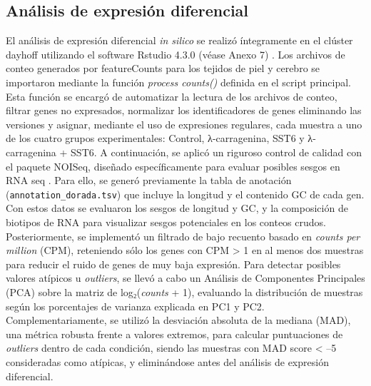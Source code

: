 \documentclass[10pt,a4paper]{article}
\begin{document}
\subsection{Análisis de expresión diferencial}  
El análisis de expresión diferencial \textit{in silico} se realizó íntegramente en el clúster dayhoff utilizando el software Rstudio 4.3.0 (véase Anexo 7) \parencite{RCore2024}. Los archivos de conteo generados por featureCounts para los tejidos de piel y cerebro se importaron mediante la función \textit{process counts()} definida en el script principal. Esta función se encargó de automatizar la lectura de los archivos de conteo, filtrar genes no expresados, normalizar los identificadores de genes eliminando las versiones y asignar, mediante el uso de expresiones regulares, cada muestra a uno de los cuatro grupos experimentales: Control, λ-carragenina, SST6 y λ-carragenina + SST6. A continuación, se aplicó un riguroso control de calidad con el paquete NOISeq, diseñado específicamente para evaluar posibles sesgos en RNA seq \parencite{Tarazona2012}. Para ello, se generó previamente la tabla de anotación (\texttt{annotation\_dorada.tsv}) que incluye la longitud y el contenido GC de cada gen. Con estos datos se evaluaron los sesgos de longitud y GC, y la composición de biotipos de RNA para visualizar sesgos potenciales en los conteos crudos. Posteriormente, se implementó un filtrado de bajo recuento basado en \textit{counts per million} (CPM), reteniendo sólo los genes con CPM > 1 en al menos dos muestras para reducir el ruido de genes de muy baja expresión. Para detectar posibles valores atípicos u \textit{outliers}, se llevó a cabo un Análisis de Componentes Principales (PCA) sobre la matriz de log₂(\textit{counts} + 1), evaluando la distribución de muestras según los porcentajes de varianza explicada en PC1 y PC2. Complementariamente, se utilizó la desviación absoluta de la mediana (MAD), una métrica robusta frente a valores extremos, para calcular puntuaciones de \textit{outliers} dentro de cada condición, siendo las muestras con MAD score < –5 consideradas como atípicas, y eliminándose antes del análisis de expresión diferencial.
\end{document}
